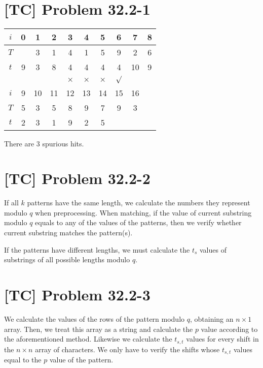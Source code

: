 \documentclass[a4paper,11pt,twocolumn]{article}
\begin{document}
  \section{[TC] Problem 32.2-1}
  \begin{table}[h]
  \centering
  \begin{tabular}{c|ccccccccc}
    \hline
    $i$ & 0 & 1 & 2 & 3 & 4 & 5 & 6 & 7 & 8 \\ \hline
    $T$ &   & 3 & 1 & 4 & 1 & 5 & 9 & 2 & 6\\
    $t$ & 9 & 3 & 8 & 4 & 4 & 4 & 4 & 10 & 9 \\
        &   &   &   & $\times$ & $\times$ & $\times$ & $\surd$ \\\hline
    $i$ & 9 & 10 & 11 & 12 & 13 & 14 & 15 & 16 \\ \hline
    $T$ & 5 & 3 & 5 & 8 & 9 & 7 & 9 & 3 \\
    $t$ & 2 & 3 & 1 & 9 & 2 & 5 &  \\ \hline
  \end{tabular}
  \end{table}
  There are 3 spurious hits.

  \section{[TC] Problem 32.2-2}
  If all $k$ patterns have the same length, we calculate the numbers they represent modulo $q$ when preprocessing. When matching, if the value of current substring modulo $q$ equals to any of the values of the patterns, then we verify whether current substring matches the pattern(s). \par
  If the patterns have different lengths, we must calculate the $t_s$ values of substrings of all possible lengths modulo $q$.

  \section{[TC] Problem 32.2-3}
  We calculate the values of the rows of the pattern modulo $q$, obtaining an $n \times 1$ array. Then, we treat this array as a string and calculate the $p$ value according to the aforementioned method. Likewise we calculate the $t_{s, t}$ values for every shift in the $n \times n$ array of characters. We only have to verify the shifts whose $t_{s,t}$ values equal to the $p$ value of the pattern.
\end{document}
